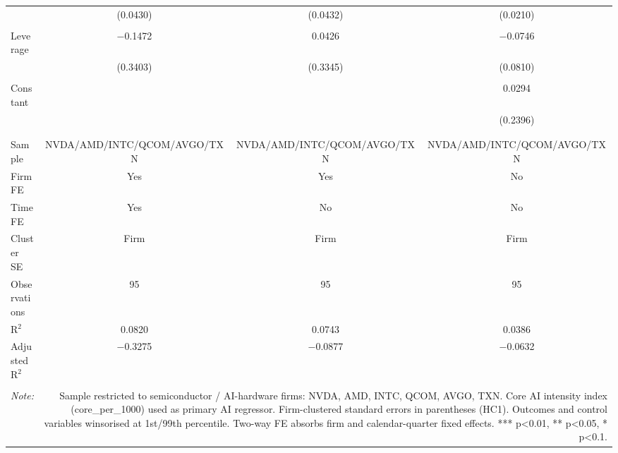 \begin{table}[!htbp]
\begin{tabular}{@{\extracolsep{5pt}}lccc}
  & (0.0430) & (0.0432) & (0.0210) \\ 
  & & & \\ 
 Leverage & $-$0.1472 & 0.0426 & $-$0.0746 \\ 
  & (0.3403) & (0.3345) & (0.0810) \\ 
  & & & \\ 
 Constant &  &  & 0.0294 \\ 
  &  &  & (0.2396) \\ 
  & & & \\ 
\hline \\[-1.8ex] 
Sample & NVDA/AMD/INTC/QCOM/AVGO/TXN & NVDA/AMD/INTC/QCOM/AVGO/TXN & NVDA/AMD/INTC/QCOM/AVGO/TXN \\ 
Firm FE & Yes & Yes & No \\ 
Time FE & Yes & No & No \\ 
Cluster SE & Firm & Firm & Firm \\ 
Observations & 95 & 95 & 95 \\ 
R$^{2}$ & 0.0820 & 0.0743 & 0.0386 \\ 
Adjusted R$^{2}$ & $-$0.3275 & $-$0.0877 & $-$0.0632 \\ 
\hline 
\hline \\[-1.8ex] 
\textit{Note:}  & \multicolumn{3}{r}{Sample restricted to semiconductor / AI-hardware firms: NVDA, AMD, INTC, QCOM, AVGO, TXN. Core AI intensity index (core_per_1000) used as primary AI regressor. Firm-clustered standard errors in parentheses (HC1). Outcomes and control variables winsorised at 1st/99th percentile. Two-way FE absorbs firm and calendar-quarter fixed effects. *** p<0.01, ** p<0.05, * p<0.1.} \\ 
\end{tabular} 
\end{table} 
